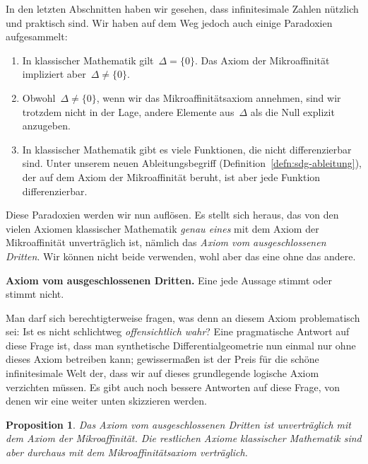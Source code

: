 \documentclass{zirkelblatt}
\theoremstyle{definition}
\theoremstyle{plain}
\newtheorem{prop}[defn]{Proposition}
\theoremstyle{remark}
\begin{document}
In den letzten Abschnitten haben wir gesehen, dass infinitesimale Zahlen
nützlich und praktisch sind. Wir haben auf dem Weg jedoch auch einige
Paradoxien aufgesammelt:
\begin{enumerate}
\item[1.] In klassischer Mathematik gilt~$\Delta = \{0\}$. Das Axiom der
Mikroaffinität impliziert aber~$\Delta \neq \{0\}$.
\item[2.] Obwohl~$\Delta \neq \{0\}$, wenn wir das Mikroaffinitätsaxiom annehmen,
sind wir trotzdem nicht in der Lage, andere Elemente aus~$\Delta$ als die Null
explizit anzugeben.
\item[3.] In klassischer Mathematik gibt es viele Funktionen, die nicht
differenzierbar sind. Unter unserem neuen Ableitungsbegriff
(Definition~\ref{defn:sdg-ableitung}), der auf dem Axiom
der Mikroaffinität beruht, ist aber jede Funktion differenzierbar.
\end{enumerate}
Diese Paradoxien werden wir nun auflösen. Es stellt sich heraus, das von den
vielen Axiomen klassischer Mathematik \emph{genau eines} mit dem Axiom der
Mikroaffinität unverträglich ist, nämlich das \emph{Axiom vom ausgeschlossenen
Dritten}. Wir können nicht beide verwenden, wohl aber das eine ohne das andere.

\begin{shaded}
\textbf{Axiom vom ausgeschlossenen Dritten.} Eine jede Aussage stimmt oder
stimmt nicht.
\end{shaded}

Man darf sich berechtigterweise fragen, was denn an diesem Axiom problematisch
sei: Ist es nicht schlichtweg \emph{offensichtlich wahr}? Eine pragmatische
Antwort auf diese Frage ist, dass man synthetische Differentialgeometrie nun einmal
nur ohne dieses Axiom betreiben kann; gewissermaßen ist der Preis für die
schöne infinitesimale Welt der, dass wir auf dieses grundlegende logische Axiom
verzichten müssen. Es gibt auch noch bessere Antworten auf diese Frage, von
denen wir eine weiter unten skizzieren werden.


\begin{prop}Das Axiom vom ausgeschlossenen Dritten ist unverträglich mit dem
Axiom der Mikroaffinität. Die restlichen Axiome klassischer Mathematik
sind aber durchaus mit dem Mikroaffinitätsaxiom verträglich.\end{prop}
\end{document}
